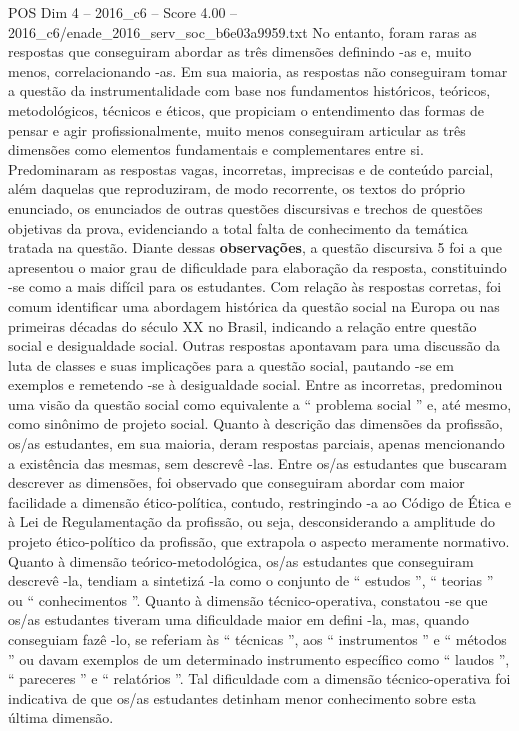 \begin{textsample}{POS Dim 4 – 2016\_c6 – Score 4.00 – 2016\_c6/enade\_2016\_serv\_soc\_b6e03a9959.txt}
No entanto, foram raras as respostas que conseguiram abordar as três dimensões definindo -as e, muito menos, correlacionando -as.
Em sua maioria, as respostas não conseguiram tomar a questão da instrumentalidade com base nos fundamentos históricos, teóricos, metodológicos, técnicos e éticos, que propiciam o entendimento das formas de pensar e agir profissionalmente, muito menos conseguiram articular as três dimensões como elementos fundamentais e complementares entre si.
Predominaram as respostas vagas, incorretas, imprecisas e de conteúdo parcial, além daquelas que reproduziram, de modo recorrente, os textos do próprio enunciado, os enunciados de outras questões discursivas e trechos de questões objetivas da prova, evidenciando a total falta de conhecimento da temática tratada na questão.
Diante dessas \textbf{observações}, a questão discursiva 5 foi a que apresentou o maior grau de dificuldade para elaboração da resposta, constituindo -se como a mais difícil para os estudantes.
Com relação às respostas corretas, foi comum identificar uma abordagem histórica da questão social na Europa ou nas primeiras décadas do século XX no Brasil, indicando a relação entre questão social e desigualdade social.
Outras respostas apontavam para uma discussão da luta de classes e suas implicações para a questão social, pautando -se em exemplos e remetendo -se à desigualdade social.
Entre as incorretas, predominou uma visão da questão social como equivalente a “ problema social ” e, até mesmo, como sinônimo de projeto social.
Quanto à descrição das dimensões da profissão, os/as estudantes, em sua maioria, deram respostas parciais, apenas mencionando a existência das mesmas, sem descrevê -las.
Entre os/as estudantes que buscaram descrever as dimensões, foi observado que conseguiram abordar com maior facilidade a dimensão ético-política, contudo, restringindo -a ao Código de Ética e à Lei de Regulamentação da profissão, ou seja, desconsiderando a amplitude do projeto ético-político da profissão, que extrapola o aspecto meramente normativo.
Quanto à dimensão teórico-metodológica, os/as estudantes que conseguiram descrevê -la, tendiam a sintetizá -la como o conjunto de “ estudos ”, “ teorias ” ou “ conhecimentos ”.
Quanto à dimensão técnico-operativa, constatou -se que os/as estudantes tiveram uma dificuldade maior em defini -la, mas, quando conseguiam fazê -lo, se referiam às “ técnicas ”, aos “ instrumentos ” e “ métodos ” ou davam exemplos de um determinado instrumento específico como “ laudos ”, “ pareceres ” e “ relatórios ”.
Tal dificuldade com a dimensão técnico-operativa foi indicativa de que os/as estudantes detinham menor conhecimento sobre esta última dimensão.

\end{textsample}
